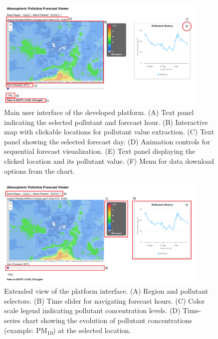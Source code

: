 \begin{figure}[h]
	\centering
	\includegraphics[width=0.9\textwidth]{fig/resultados-interfaz-mapa.PNG}
	\caption{Main user interface of the developed platform.
		(A) Text panel indicating the selected pollutant and forecast hour. 
		(B) Interactive map with clickable locations for pollutant value extraction. 
		(C) Text panel showing the selected forecast day.  
		(D) Animation controls for sequential forecast visualization.
		(E) Text panel displaying the clicked location and its pollutant value.  
		(F) Menu for data download options from the chart.}
	\label{fig:interface}
\end{figure}

\begin{figure}[h]
	\centering
	\includegraphics[width=0.9\textwidth]{fig/resultados-interfaz-editada.PNG}
	\caption{Extended view of the platform interface. 
		(A) Region and pollutant selectors.
		(B) Time slider for navigating forecast hours. 
		(C) Color scale legend indicating pollutant concentration levels.
		(D) Time-series chart showing the evolution of pollutant concentrations (example: PM\textsubscript{10}) at the selected location.}
	\label{fig:interface-extra}
\end{figure}



